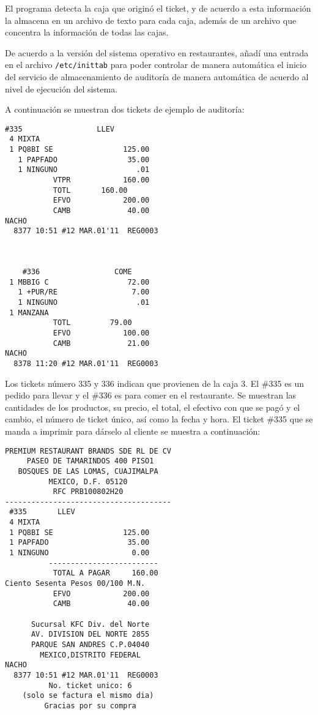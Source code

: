 El programa detecta la caja que originó el ticket, y de acuerdo a esta información la almacena en un archivo de texto para cada caja, además de un archivo que concentra la información de todas las cajas.

De acuerdo a la versión del sistema operativo en restaurantes, añadí una entrada en el archivo \texttt{/etc/inittab} para poder controlar de manera automática el inicio del servicio de almacenamiento de auditoría de manera automática de acuerdo al nivel de ejecución del sistema. 

A continuación se muestran dos tickets de ejemplo de auditoría:

\begin{Verbatim}[fontsize=\small]
    #335                 LLEV  
 4 MIXTA   
 1 PQ8BI SE                125.00  
   1 PAPFADO                35.00  
   1 NINGUNO                  .01  
           VTPR            160.00  
           TOTL       160.00  
           EFVO            200.00  
           CAMB             40.00  
NACHO  
  8377 10:51 #12 MAR.01'11  REG0003  
 


    #336                 COME  
 1 MBBIG C                  72.00  
   1 +PUR/RE                 7.00  
   1 NINGUNO                  .01  
 1 MANZANA   
           TOTL         79.00  
           EFVO            100.00  
           CAMB             21.00  
NACHO  
  8378 11:20 #12 MAR.01'11  REG0003  
\end{Verbatim}

Los tickets número 335 y 336 indican que provienen de la caja 3. El \#335 es un pedido para llevar y el \#336 es para comer en el restaurante. Se muestran las cantidades de los productos, su precio, el total, el efectivo con que se pagó y el cambio, el número de ticket único, así como la fecha y hora. El ticket \#335 que se manda a imprimir para dárselo al cliente se muestra a continuación:

\begin{Verbatim}[fontsize=\small]
 PREMIUM RESTAURANT BRANDS SDE RL DE CV  
     PASEO DE TAMARINDOS 400 PISO1       
   BOSQUES DE LAS LOMAS, CUAJIMALPA      
          MEXICO, D.F. 05120             
           RFC PRB100802H20              
--------------------------------------   
 #335       LLEV  
 4 MIXTA   
 1 PQ8BI SE                125.00  
 1 PAPFADO                  35.00  
 1 NINGUNO                   0.00  
          -------------------------  
           TOTAL A PAGAR     160.00  
Ciento Sesenta Pesos 00/100 M.N.  
           EFVO            200.00  
           CAMB             40.00  
                                         
      Sucursal KFC Div. del Norte        
      AV. DIVISION DEL NORTE 2855        
      PARQUE SAN ANDRES C.P.04040        
        MEXICO,DISTRITO FEDERAL          
NACHO  
  8377 10:51 #12 MAR.01'11  REG0003  
          No. ticket unico: 6     
    (solo se factura el mismo dia)       
         Gracias por su compra           
\end{Verbatim}

